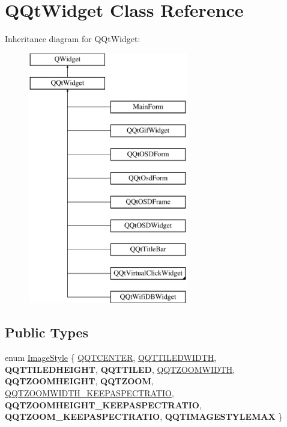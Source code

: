\hypertarget{class_q_qt_widget}{}\section{Q\+Qt\+Widget Class Reference}
\label{class_q_qt_widget}
Inheritance diagram for Q\+Qt\+Widget\+:\begin{figure}[H]
\begin{center}
\leavevmode
\includegraphics[height=11.000000cm]{class_q_qt_widget}
\end{center}
\end{figure}
\subsection*{Public Types}
\begin{DoxyCompactItemize}
\item 
enum \mbox{\hyperlink{class_q_qt_widget_a5a6d58f533c2f43c854f47f71d086cce}{Image\+Style}} \{ \newline
\mbox{\hyperlink{class_q_qt_widget_a5a6d58f533c2f43c854f47f71d086ccea67fe3a192a16e09bb76e0d6ec23524d7}{Q\+Q\+T\+C\+E\+N\+T\+ER}}, 
\mbox{\hyperlink{class_q_qt_widget_a5a6d58f533c2f43c854f47f71d086cceaf3957f90f03e90dedfe35e5debfb1b29}{Q\+Q\+T\+T\+I\+L\+E\+D\+W\+I\+D\+TH}}, 
{\bfseries Q\+Q\+T\+T\+I\+L\+E\+D\+H\+E\+I\+G\+HT}, 
{\bfseries Q\+Q\+T\+T\+I\+L\+ED}, 
\newline
\mbox{\hyperlink{class_q_qt_widget_a5a6d58f533c2f43c854f47f71d086cceabbda1cf537f85a1d4ee66863907732d6}{Q\+Q\+T\+Z\+O\+O\+M\+W\+I\+D\+TH}}, 
{\bfseries Q\+Q\+T\+Z\+O\+O\+M\+H\+E\+I\+G\+HT}, 
{\bfseries Q\+Q\+T\+Z\+O\+OM}, 
\mbox{\hyperlink{class_q_qt_widget_a5a6d58f533c2f43c854f47f71d086cceae6b0a3f96c2c8a62f909690d00e2853b}{Q\+Q\+T\+Z\+O\+O\+M\+W\+I\+D\+T\+H\+\_\+\+K\+E\+E\+P\+A\+S\+P\+E\+C\+T\+R\+A\+T\+IO}}, 
\newline
{\bfseries Q\+Q\+T\+Z\+O\+O\+M\+H\+E\+I\+G\+H\+T\+\_\+\+K\+E\+E\+P\+A\+S\+P\+E\+C\+T\+R\+A\+T\+IO}, 
{\bfseries Q\+Q\+T\+Z\+O\+O\+M\+\_\+\+K\+E\+E\+P\+A\+S\+P\+E\+C\+T\+R\+A\+T\+IO}, 
{\bfseries Q\+Q\+T\+I\+M\+A\+G\+E\+S\+T\+Y\+L\+E\+M\+AX}
 \}
\end{DoxyCompactItemize}
